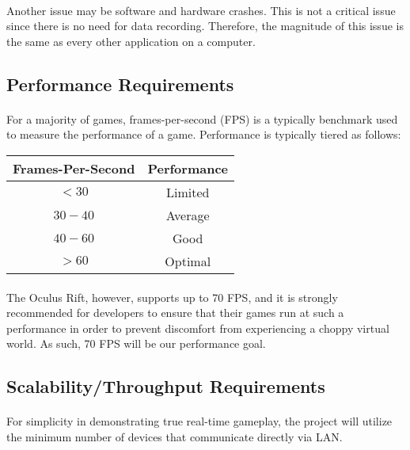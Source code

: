 \paragraph{} Another issue may be software and hardware crashes. This is not a critical issue since there is no need for data recording. Therefore, the magnitude of this issue is the same as every other application on a computer.

\subsection{Performance Requirements}

\paragraph{} For a majority of games, frames-per-second (FPS) is a typically benchmark used to measure the performance of a game. Performance is typically tiered as follows:

\begin{table}[H]
	\renewcommand*{\arraystretch}{1.5}
	\centering
	\begin{tabular}{c c}
	Frames-Per-Second		&	Performance\\
	\hline
	\( < 30 \)				&	Limited\\
	\( 30 - 40	\)			&	Average\\
	\( 40 - 60	\)			&	Good\\
	\( > 60	\)				&	Optimal
	\end{tabular}
\end{table}

\paragraph{} The Oculus Rift, however, supports up to 70 FPS, and it is strongly recommended for developers to ensure that their games run at such a performance in order to prevent discomfort from experiencing a choppy virtual world. As such, 70 FPS will be our performance goal.

\subsection{Scalability/Throughput Requirements}

\paragraph{} For simplicity in demonstrating true real-time gameplay, the project will utilize the minimum number of devices that communicate directly via LAN.


